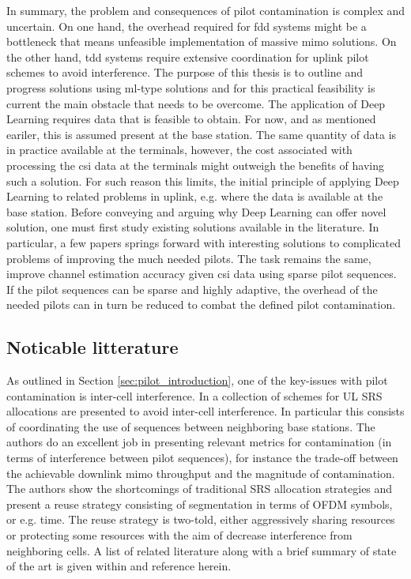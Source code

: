 In summary, the problem and consequences of pilot contamination is complex and uncertain. On one hand, the overhead required for \gls{fdd} systems might be a bottleneck that means unfeasible implementation of massive \gls{mimo} solutions. On the other hand, \gls{tdd} systems require extensive coordination for uplink pilot schemes to avoid interference. The purpose of this thesis is to outline and progress solutions using \gls{ml}-type solutions and for this practical feasibility is current the main obstacle that needs to be overcome. The application of Deep Learning requires data that is feasible to obtain. For now, and as mentioned eariler, this is assumed present at the base station. The same quantity of data is in practice available at the terminals, however, the cost associated with processing the \gls{csi} data at the terminals might outweigh the benefits of having such a solution. For such reason this limits, the initial principle of applying Deep Learning to related problems in uplink, e.g. where the data is available at the base station. Before conveying and arguing why Deep Learning can offer novel solution, one must first study existing solutions available in the literature. In particular, a few papers springs forward with interesting solutions to complicated problems of improving the much needed pilots. The task remains the same, improve channel estimation accuracy given \gls{csi} data using sparse pilot sequences. If the pilot sequences can be sparse and highly adaptive, the overhead of the needed pilots can in turn be reduced to combat the defined pilot contamination. 

\subsection{Noticable litterature}
As outlined in Section \ref{sec:pilot_introduction}, one of the key-issues with pilot contamination is inter-cell interference. In \cite{Galati2017UplinkMIMO} a collection of schemes for UL SRS allocations are presented to avoid inter-cell interference. In particular this consists of coordinating the use of sequences between neighboring base stations. The authors do an excellent job in presenting relevant metrics for contamination (in terms of interference between pilot sequences), for instance the trade-off between the achievable downlink \gls{mimo} throughput and the magnitude of contamination. The authors show the shortcomings of traditional SRS allocation strategies and present a reuse strategy consisting of segmentation in terms of OFDM symbols, or e.g. time. The reuse strategy is two-told, either aggressively sharing resources or protecting some resources with the aim of decrease interference from neighboring cells. A list of related literature along with a brief summary of state of the art is given within \cite{Galati2017UplinkMIMO} and reference herein.

